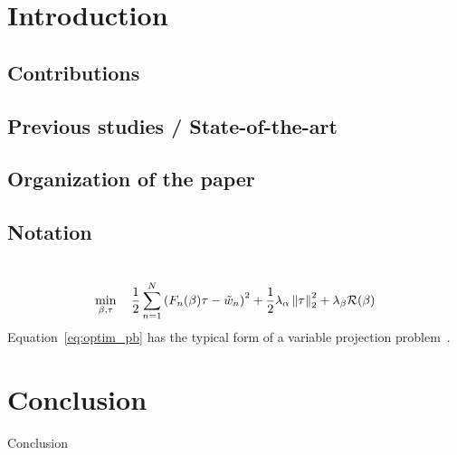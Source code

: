 \section{Introduction}


\subsection{Contributions}


\subsection{Previous studies / State-of-the-art}
\label{ssec:prev_stud}


\subsection{Organization of the paper}


\subsection{Notation}


\section{}


\section{}

\begin{equation}
  \label{eq:optim_pb}
  \min_{\beta,\tau} \quad
  \frac{1}{2} \sum_{n=1}^{N} {\left(F_{n}(\beta)\tau - \tilde{w}_{n}\right)}^{2}
  +\frac{1}{2}\lambda_{\alpha}\norm{\tau}_{2}^{2}
  +\lambda_{\beta}\mR(\beta)
\end{equation}
Equation~\eqref{eq:optim_pb} has the typical form of a variable projection
problem~\cite{OLeary_D_2012_j-comput-optim-appl_variable_pnlsp}.


\section{}


\section{Conclusion}
\label{sec:concl}

Conclusion
